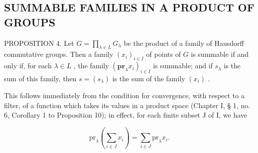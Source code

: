 \subsection{SUMMABLE FAMILIES IN A PRODUCT OF GROUPS}

PROPOSITION 4. Let \(G = \prod_{\lambda \in L} G_{\lambda}\) be the product of a family of Hausdorff commutative groups. Then a family \((x_{i})_{i \in I}\) of points of \(G\) is summable if and only if, for each \(\lambda \in L\) , the family \((\mathbf{pr}_{\lambda} x_{i})_{i \in I}\) is summable; and if \(s_{\lambda}\) is the sum of this family, then \(s = (s_{\lambda})\) is the sum of the family \((x_{i})\) .

This follows immediately from the condition for convergence, with respect to a filter, of a function which takes its values in a product space (Chapter I, § 1, no. 6, Corollary 1 to Proposition 10); in effect, for each finite subset J of I, we have

\[
\mathrm{pr} _ {\lambda} \left(\sum_ {i \in J} x _ {i}\right) = \sum_ {i \in J} \mathrm{pr} _ {\lambda} x _ {i}.
\]

